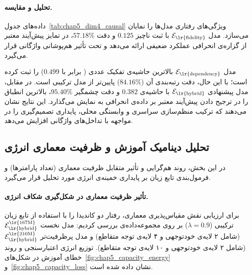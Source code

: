 \paragraph{تحلیل و مقایسه.}
داده‌های جدول~\ref{tab:chap5_dim4_causal} ویژگی‌های رفتاری مدل‌ها را نمایان می‌سازد. مدل $\mathcal{E}_{\text{\lr{fidelity}}}$ با ثبت  ناچیز $0.125$ و دقت $57.18\%$، در تمایز پیش‌آیند معتبر از گزاره‌ی انحرافی عملکرد ضعیفی ارائه می‌دهد و تحت تأثیر هم‌پوشانی واژگانی قرار می‌گیرد. 

مدل $\mathcal{E}_{\text{\lr{dependency}}}$ بالاترین حاشیه‌ی تفکیک عددی ( برابر با $0.499$) را ثبت کرده است؛ با این حال، دقت رتبه‌بندی آن ($84.16\%$) پایین‌تر از مدل ترکیبی است. در مقابل، مدل پیشنهادی $\mathcal{E}_{\text{\lr{hybrid}}}$ با حاشیه‌ی $0.382$ و دقت چشمگیر $95.40\%$، بالاترین انطباق را در ترجیح دادن پیش‌آیند معتبر بر داده‌ی انحرافی به نمایش می‌گذارد. این نتایج نشان می‌دهند که ترکیب منظم‌سازی سراسری و وابستگی محلی، پایداری تصمیم‌گیری را در مواجهه با تداخل‌های واژگانی افزایش می‌دهد.


\subsection{تحلیل دینامیک آموزش و ظرفیت معماری انرژی}\label{sec:5-2-3}

در این بخش، روند هم‌گرایی و تأثیر متقابل ظرفیت معماری (تعداد پارامترها) و فرمول‌بندی تابع زیان بر پایداری خمینه‌ی انرژی مورد تحلیل قرار می‌گیرد.

\paragraph{تأثیر ظرفیت معماری در شکل‌گیری شکاف انرژی.}
برای ارزیابی نقش مقیاس‌پذیری معماری، رفتار دو کاندیدا را با استفاده از تابع زیان ترکیبی ($\lambda=0.9$) بر روی مجموعه‌داده‌ی  بررسی کردیم: مدل نخست $\mathcal{E}_{\text{\lr{hybrid}}}^{\text{\lr{167M}}}$ (شامل ۲ لایه‌ی خودتوجهی و ۴ لایه‌ی توجه متقاطع) و مدل پرظرفیت‌تر $\mathcal{E}_{\text{\lr{hybrid}}}^{\text{\lr{210M}}}$ (شامل ۲ لایه‌ی خودتوجهی و ۱۰ لایه‌ی توجه متقاطع). توزیع انرژی اعتبارسنجی و روند خطای آموزش در شکل‌های~\ref{fig:chap5_capacity_energy} و~\ref{fig:chap5_capacity_loss} نشان داده شده است.

